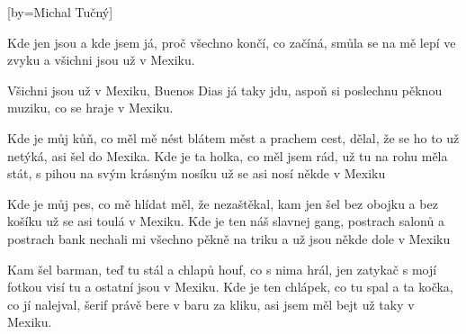 [by={Michal Tučný}]

\beginverse{}
Kde jen jsou a kde jsem já, proč všechno končí, co začíná,
smůla se na mě lepí ve zvyku a všichni jsou už v Mexiku.
\endverse{}

\beginchorus{}
Všichni jsou už v Mexiku, Buenos Dias já taky jdu,
aspoň si poslechnu pěknou muziku, co se hraje v Mexiku.
\endchorus{}

\beginverse{}
Kde je můj kůň, co měl mě nést blátem měst a prachem cest,
dělal, že se ho to už netýká, asi šel do Mexika.
Kde je ta holka, co měl jsem rád, už tu na rohu měla stát,
s pihou na svým krásným nosíku už se asi nosí někde v Mexiku
\endverse{}

\beginchorus{}
\phantom{}
\endchorus{}

\beginverse{}
Kde je můj pes, co mě hlídat měl, že nezaštěkal, kam jen šel
bez obojku a bez košíku už se asi toulá v Mexiku.
Kde je ten náš slavnej gang, postrach salonů a postrach bank
nechali mi všechno pěkně na triku a už jsou někde dole v Mexiku
\endverse{}

\beginchorus{}
\phantom{}
\endchorus{}

\beginverse{}
Kam šel barman, teď tu stál a chlapů houf, co s nima hrál,
jen zatykač s mojí fotkou visí tu a ostatní jsou v Mexiku.
Kde je ten chlápek, co tu spal a ta kočka, co jí nalejval,
šerif právě bere v baru za kliku, asi jsem měl bejt už taky v Mexiku.
\endverse{}

\beginchorus{}
\phantom{}
\endchorus{}

\endsong{}

